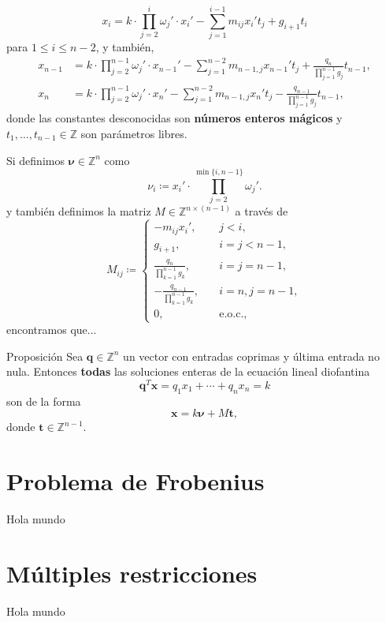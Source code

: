 \documentclass[aspectratio=169,professionalfonts]{beamer}
\newcommand{\Z}{\mathbb{Z}}
\renewcommand{\vec}[1]{\boldsymbol{#1}}
\begin{document}
\begin{frame}
	\begin{equation*}
		x_i 
			= k \cdot \prod_{j=2}^{i}\omega_j' \cdot x_i' - \sum_{j=1}^{i - 1}m_{ij}x_i'
			t_j + g_{i + 1}t_i
	\end{equation*}
	para $1 \leq i \leq n - 2$, y también,
	\begin{align*}
		x_{n-1} &= k \cdot \prod_{j=2}^{n-1} \omega_j' \cdot x_{n-1}' - \sum_{j=1}^{n-2}
		m_{n-1,j}x_{n-1}' t_j + \frac{q_n}{\prod_{j=1}^{n-1}g_j} t_{n-1}, \\
		x_{n} &= k \cdot \prod_{j=2}^{n-1} \omega_j' \cdot x_{n}' - \sum_{j=1}^{n-2}
		m_{n-1,j}x_{n}' t_j - \frac{q_{n - 1}}{\prod_{j=1}^{n-1}g_j} t_{n-1},
	\end{align*}
	donde las constantes desconocidas son \textbf{números enteros mágicos} y
	$t_1, \ldots, t_{n-1} \in \Z$ son parámetros libres.
\end{frame}

\begin{frame}
	Si definimos $\vec{\nu} \in \Z^n$ como
	\begin{equation*}
		\nu_i \coloneq x_i' \cdot \prod_{j = 2}^{\min{\lbrace i, n - 1 \rbrace}}\omega_j'.
	\end{equation*}
	y también definimos la matriz $M \in \Z^{n \times (n - 1)}$ a través de
	\begin{equation*}
		M_{ij} \coloneq \begin{cases}
			-m_{ij}x_i', &\quad j < i, \\
			g_{i + 1},  &\quad i = j < n - 1, \\
			\frac{q_n}{\prod_{k=1}^{n-1}g_k}, &\quad i = j = n - 1, \\
			-\frac{q_{n-1}}{\prod_{k=1}^{n-1}g_k}, &\quad i = n, j = n - 1, \\
			0, &\quad \text{e.o.c.},
		\end{cases}
	\end{equation*}
	encontramos que...
\end{frame}

\begin{frame}
	\begin{block}{Proposición}
		Sea $\vec{q} \in \Z^n$ un vector con entradas coprimas y última entrada no
		nula. Entonces \textbf{todas} las soluciones enteras de la ecuación lineal
		diofantina
		\begin{equation*}
			\vec{q}^T\vec{x} = q_1x_1 + \cdots + q_nx_n = k
		\end{equation*}
		son de la forma
		\begin{equation*}
			\vec{x} = k\vec{\nu} + M\vec{t},
		\end{equation*}
		donde $\vec{t} \in \Z^{n-1}$.
	\end{block}
\end{frame}

\section{Problema de Frobenius}
\begin{frame}
	Hola mundo
\end{frame}

\section{Múltiples restricciones}
\begin{frame}
	Hola mundo
\end{frame}
\end{document}
